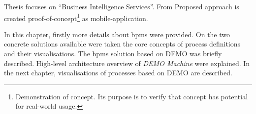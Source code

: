 Thesis focuses on ``Business Intelligence Services''. From Proposed approach is created proof-of-concept\footnote{Demonstration of concept. Its purpose is to verify that concept has potential for real-world usage\cite{proof-of-concept-2018}.} as mobile-application.

In this chapter, firstly more details about \gls{bpms} were provided. On the two concrete solutions available were taken the core concepts of process definitions and their visualisations. The \gls{bpms} solution based on DEMO was briefly described. High-level architecture overview of \textit{DEMO Machine} were explained. In the next chapter, visualisations of processes based on DEMO are described. 

